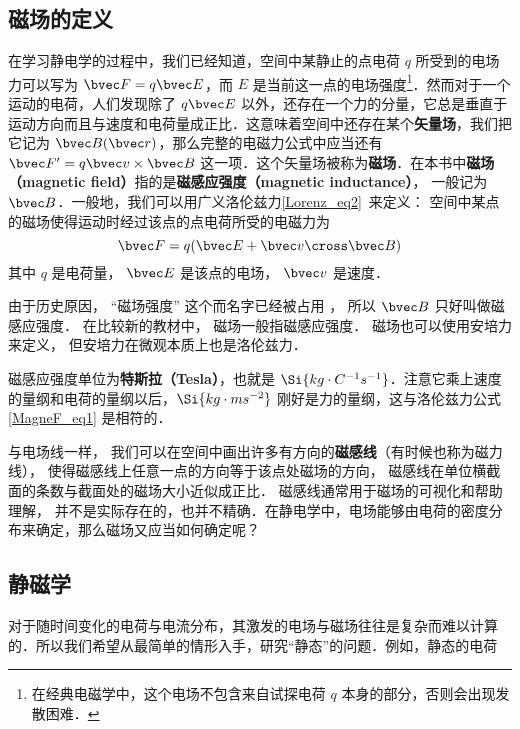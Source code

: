 
\begin{issues}
\issueDraft
\end{issues}

\subsection{磁场的定义}
在学习静电学的过程中，我们已经知道，空间中某静止的点电荷 $q$ 所受到的电场力可以写为 $\bvec F=q\bvec E$，而 $E$ 是当前这一点的电场强度\footnote{在经典电磁学中，这个电场不包含来自试探电荷 $q$ 本身的部分，否则会出现发散困难．}．然而对于一个运动的电荷，人们发现除了 $q\bvec E$ 以外，还存在一个力的分量，它总是垂直于运动方向而且与速度和电荷量成正比．这意味着空间中还存在某个\textbf{矢量场}，我们把它记为 $\bvec B(\bvec r)$，那么完整的电磁力公式中应当还有 $\bvec F'=q\bvec v\times \bvec B$ 这一项．这个矢量场被称为\textbf{磁场}．在本书中\textbf{磁场（magnetic field）}指的是\textbf{磁感应强度（magnetic inductance）}， 一般记为 $\bvec B$．一般地，我们可以用广义洛伦兹力\autoref{Lorenz_eq2}~来定义： 空间中某点的磁场使得运动时经过该点的点电荷所受的电磁力为
\begin{equation}\label{MagneF_eq1}
\bvec F = q(\bvec E + \bvec v \cross \bvec B)
\end{equation}
其中 $q$ 是电荷量， $\bvec E$ 是该点的电场， $\bvec v$ 是速度．

由于历史原因， “磁场强度” 这个而名字已经被占用%
， 所以 $\bvec B$ 只好叫做磁感应强度． 在比较新的教材中， 磁场一般指磁感应强度． 磁场也可以使用安培力来定义， 但安培力在微观本质上也是洛伦兹力． 


磁感应强度单位为\textbf{特斯拉（Tesla）}，也就是 $\Si{kg\cdot C^{-1}s^{-1}}$．注意它乘上速度的量纲和电荷的量纲以后，$\Si{kg\cdot ms^{-2}}$ 刚好是力的量纲，这与洛伦兹力公式\autoref{MagneF_eq1} 是相符的．

与电场线一样， 我们可以在空间中画出许多有方向的\textbf{磁感线}（有时候也称为磁力线）， 使得磁感线上任意一点的方向等于该点处磁场的方向， 磁感线在单位横截面的条数与截面处的磁场大小近似成正比． 磁感线通常用于磁场的可视化和帮助理解， 并不是实际存在的，也并不精确．在静电学中，电场能够由电荷的密度分布来确定，那么磁场又应当如何确定呢？

\subsection{静磁学}
对于随时间变化的电荷与电流分布，其激发的电场与磁场往往是复杂而难以计算的．所以我们希望从最简单的情形入手，研究“静态”的问题．例如，静态的电荷